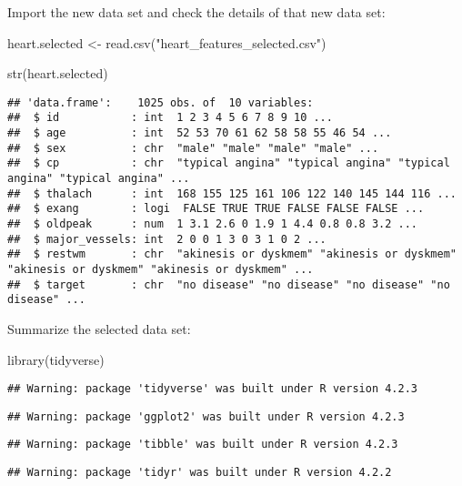 \documentclass[
]{article}
\newenvironment{Shaded}{\begin{snugshade}}{\end{snugshade}}
\newcommand{\FunctionTok}[1]{\textcolor[rgb]{0.00,0.00,0.00}{#1}}
\newcommand{\NormalTok}[1]{#1}
\newcommand{\OtherTok}[1]{\textcolor[rgb]{0.56,0.35,0.01}{#1}}
\newcommand{\StringTok}[1]{\textcolor[rgb]{0.31,0.60,0.02}{#1}}
\begin{document}
Import the new data set and check the details of that new data set:

\begin{Shaded}
\begin{Highlighting}[]
\NormalTok{heart.selected }\OtherTok{\textless{}{-}} \FunctionTok{read.csv}\NormalTok{(}\StringTok{"heart\_features\_selected.csv"}\NormalTok{)}

\FunctionTok{str}\NormalTok{(heart.selected)}
\end{Highlighting}
\end{Shaded}

\begin{verbatim}
## 'data.frame':    1025 obs. of  10 variables:
##  $ id           : int  1 2 3 4 5 6 7 8 9 10 ...
##  $ age          : int  52 53 70 61 62 58 58 55 46 54 ...
##  $ sex          : chr  "male" "male" "male" "male" ...
##  $ cp           : chr  "typical angina" "typical angina" "typical angina" "typical angina" ...
##  $ thalach      : int  168 155 125 161 106 122 140 145 144 116 ...
##  $ exang        : logi  FALSE TRUE TRUE FALSE FALSE FALSE ...
##  $ oldpeak      : num  1 3.1 2.6 0 1.9 1 4.4 0.8 0.8 3.2 ...
##  $ major_vessels: int  2 0 0 1 3 0 3 1 0 2 ...
##  $ restwm       : chr  "akinesis or dyskmem" "akinesis or dyskmem" "akinesis or dyskmem" "akinesis or dyskmem" ...
##  $ target       : chr  "no disease" "no disease" "no disease" "no disease" ...
\end{verbatim}

Summarize the selected data set:

\begin{Shaded}
\begin{Highlighting}[]
\FunctionTok{library}\NormalTok{(tidyverse)}
\end{Highlighting}
\end{Shaded}

\begin{verbatim}
## Warning: package 'tidyverse' was built under R version 4.2.3
\end{verbatim}

\begin{verbatim}
## Warning: package 'ggplot2' was built under R version 4.2.3
\end{verbatim}

\begin{verbatim}
## Warning: package 'tibble' was built under R version 4.2.3
\end{verbatim}

\begin{verbatim}
## Warning: package 'tidyr' was built under R version 4.2.2
\end{verbatim}
\end{document}
